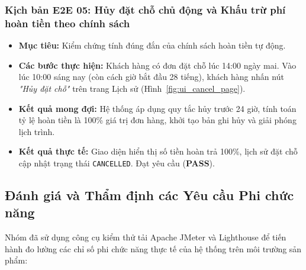 \subsubsection*{Kịch bản E2E 05: Hủy đặt chỗ chủ động và Khấu trừ phí hoàn tiền theo chính sách}
\begin{itemize}
    \item \textbf{Mục tiêu:} Kiểm chứng tính đúng đắn của chính sách hoàn tiền tự động.
    \item \textbf{Các bước thực hiện:} Khách hàng có đơn đặt chỗ lúc 14:00 ngày mai. Vào lúc 10:00 sáng nay (còn cách giờ bắt đầu 28 tiếng), khách hàng nhấn nút \textit{"Hủy đặt chỗ"} trên trang Lịch sử (Hình~\ref{fig:ui_cancel_page}).
    \item \textbf{Kết quả mong đợi:} Hệ thống áp dụng quy tắc hủy trước 24 giờ, tính toán tỷ lệ hoàn tiền là 100\% giá trị đơn hàng, khởi tạo bản ghi hủy và giải phóng lịch trình.
    \item \textbf{Kết quả thực tế:} Giao diện hiển thị số tiền hoàn trả 100\%, lịch sử đặt chỗ cập nhật trạng thái \texttt{CANCELLED}. Đạt yêu cầu (\textbf{PASS}).
\end{itemize}

\subsection{Đánh giá và Thẩm định các Yêu cầu Phi chức năng}

Nhóm đã sử dụng công cụ kiểm thử tải Apache JMeter và Lighthouse để tiến hành đo lường các chỉ số phi chức năng thực tế của hệ thống trên môi trường sản phẩm:

